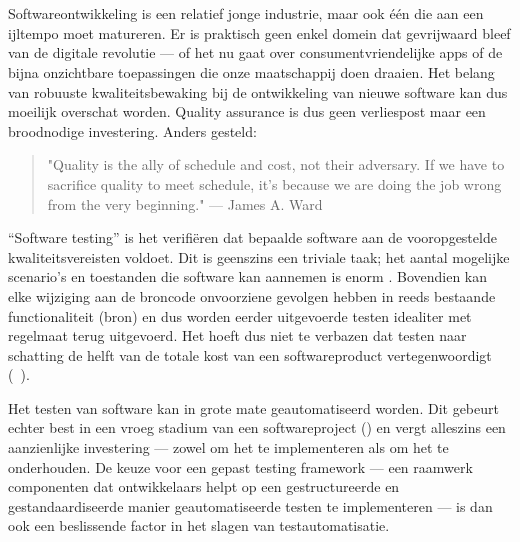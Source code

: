 
\chapter{}
\label{ch:inleiding}

Softwareontwikkeling is een relatief jonge industrie, maar ook één die aan een ijltempo moet matureren. Er is praktisch geen enkel domein dat gevrijwaard bleef van de digitale revolutie — of het nu gaat over consumentvriendelijke apps of de bijna onzichtbare toepassingen die onze maatschappij doen draaien. Het belang van robuuste kwaliteitsbewaking bij de ontwikkeling van nieuwe software kan dus moeilijk overschat worden. Quality assurance is dus geen verliespost maar een broodnodige investering. Anders gesteld:

\begin{quote}
"Quality is the ally of schedule and cost, not their adversary. If we have to sacrifice quality to meet schedule, it's because we are doing the job wrong from the very beginning." — James A. Ward \autocite{Olalere2019}
\end{quote}

“Software testing” is het verifiëren dat bepaalde software aan de vooropgestelde kwaliteitsvereisten voldoet. Dit is geenszins een triviale taak; het aantal mogelijke scenario’s en toestanden die software kan aannemen is enorm \autocite{Stamelos2007}. Bovendien kan elke wijziging aan de broncode onvoorziene gevolgen hebben in reeds bestaande functionaliteit (bron) en dus worden eerder uitgevoerde testen idealiter met regelmaat terug uitgevoerd. Het hoeft dus niet te verbazen dat testen naar schatting de helft van de totale kost van een softwareproduct vertegenwoordigt (~\cite{Kasurinen2010,Tsai2001,Dadwal2018}).

Het testen van software kan in grote mate geautomatiseerd worden. Dit gebeurt echter best in een vroeg stadium van een softwareproject (\cite{Burgin2007}) en vergt alleszins een aanzienlijke investering \autocite{Fewster2001,Kumar2016} — zowel om het te implementeren als om het te onderhouden. De keuze voor een gepast testing framework — een raamwerk componenten dat ontwikkelaars helpt op een gestructureerde en gestandaardiseerde manier geautomatiseerde testen te implementeren — is dan ook een beslissende factor in het slagen van testautomatisatie.


